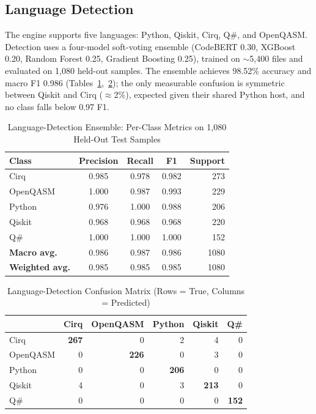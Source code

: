 \documentclass[10pt,conference]{IEEEtran}
\begin{document}
\subsection{Language Detection}

The engine supports five languages: Python, Qiskit, Cirq, Q\#, and OpenQASM. Detection uses a four-model soft-voting ensemble (CodeBERT 0.30, XGBoost 0.20, Random Forest 0.25, Gradient Boosting 0.25), trained on $\sim$5{,}400 files and evaluated on 1{,}080 held-out samples. The ensemble achieves 98.52\% accuracy and macro F1 0.986 (Tables~\ref{tab:lang-prf},~\ref{tab:lang-cm}); the only measurable confusion is symmetric between Qiskit and Cirq ($\approx$2\%), expected given their shared Python host, and no class falls below 0.97 F1.

\begin{table}[htbp]
\caption{Language-Detection Ensemble: Per-Class Metrics on 1{,}080 Held-Out Test Samples}
\label{tab:lang-prf}
\centering
\footnotesize
\setlength{\tabcolsep}{4pt}
\begin{tabular}{lcccr}
\toprule
\textbf{Class} & \textbf{Precision} & \textbf{Recall} & \textbf{F1} & \textbf{Support} \\
\midrule
Cirq      & 0.985 & 0.978 & 0.982 & 273 \\
OpenQASM  & 1.000 & 0.987 & 0.993 & 229 \\
Python    & 0.976 & 1.000 & 0.988 & 206 \\
Qiskit    & 0.968 & 0.968 & 0.968 & 220 \\
Q\#       & 1.000 & 1.000 & 1.000 & 152 \\
\midrule
\textbf{Macro avg.}    & 0.986 & 0.987 & 0.986 & 1080 \\
\textbf{Weighted avg.} & 0.985 & 0.985 & 0.985 & 1080 \\
\bottomrule
\end{tabular}
\end{table}

\begin{table}[htbp]
\caption{Language-Detection Confusion Matrix (Rows = True, Columns = Predicted)}
\label{tab:lang-cm}
\centering
\footnotesize
\setlength{\tabcolsep}{4pt}
\begin{tabular}{lrrrrr}
\toprule
 & \textbf{Cirq} & \textbf{OpenQASM} & \textbf{Python} & \textbf{Qiskit} & \textbf{Q\#} \\
\midrule
Cirq     & \textbf{267} &   0 &   2 &   4 &   0 \\
OpenQASM &   0 & \textbf{226} &   0 &   3 &   0 \\
Python   &   0 &   0 & \textbf{206} &   0 &   0 \\
Qiskit   &   4 &   0 &   3 & \textbf{213} &   0 \\
Q\#      &   0 &   0 &   0 &   0 & \textbf{152} \\
\bottomrule
\end{tabular}
\end{table}
\end{document}
